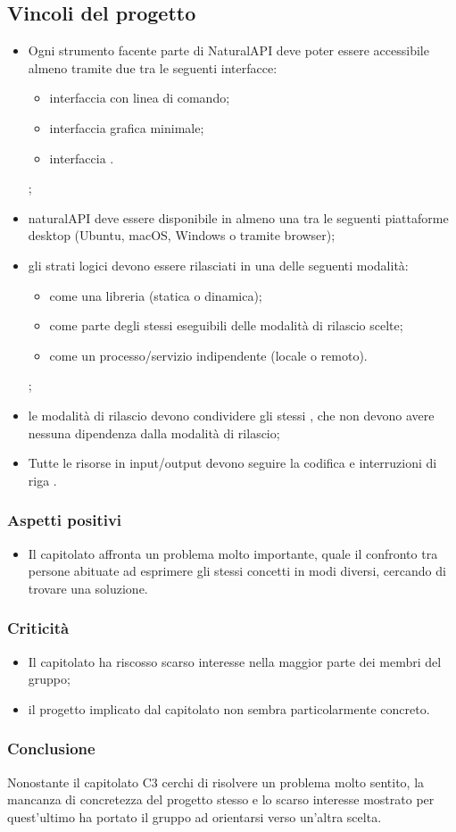   \subsection{Vincoli del progetto}
   	\begin{itemize}
   		\item Ogni strumento facente parte di NaturalAPI deve poter essere accessibile almeno tramite due tra le seguenti interfacce:
   			\begin{itemize}
   				\item interfaccia con linea di comando;
   				\item interfaccia grafica minimale;
   				\item interfaccia .
   			\end{itemize};
   			\item naturalAPI deve essere disponibile in almeno una tra le seguenti piattaforme desktop (Ubuntu, macOS, Windows o tramite browser);
   			\item gli strati logici devono essere rilasciati in una delle seguenti modalità:
   				\begin{itemize}
   					\item come una libreria (statica o dinamica);
   					\item come parte degli stessi eseguibili delle modalità di rilascio scelte;
   					\item come un processo/servizio indipendente (locale o remoto).
   				\end{itemize};
   			\item le modalità di rilascio devono condividere gli stessi , che non devono avere nessuna dipendenza dalla modalità di rilascio;
   			\item Tutte le risorse in input/output devono seguire la codifica  e interruzioni di riga .
   	\end{itemize}

    \subsubsection{Aspetti positivi}
    \begin{itemize}
      \item Il capitolato affronta un problema molto importante, quale il confronto tra persone abituate ad esprimere gli stessi concetti in modi diversi, cercando di trovare una soluzione.
    \end{itemize}
    \subsubsection{Criticità}
    \begin{itemize}
    		\item Il capitolato ha riscosso scarso interesse nella maggior parte dei membri del gruppo;
    		\item il progetto implicato dal capitolato non sembra particolarmente concreto.
    \end{itemize}
    \subsubsection{Conclusione}
    Nonostante il capitolato C3 cerchi di risolvere un problema molto sentito, la mancanza di concretezza del progetto stesso e lo scarso interesse mostrato per quest'ultimo ha portato il gruppo ad orientarsi verso un'altra scelta.
